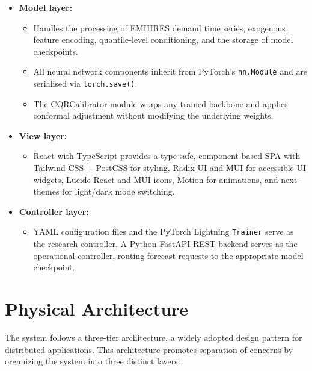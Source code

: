 \begin{itemize}
  \item \textbf{Model layer:}
  \begin{itemize}
    \item Handles the processing of EMHIRES demand time series, exogenous
          feature encoding, quantile-level conditioning, and the storage
          of model checkpoints.
    \item All neural network components inherit from PyTorch's
          \texttt{nn.Module} and are serialised via \texttt{torch.save()}.
    \item The CQRCalibrator module wraps any trained backbone and applies
          conformal adjustment without modifying the underlying weights.
  \end{itemize}
  \item \textbf{View layer:}
  \begin{itemize}
    \item React with TypeScript provides a
          type-safe, component-based SPA with Tailwind CSS + PostCSS
          for styling, Radix UI and MUI for accessible UI widgets,
          Lucide React and MUI icons, Motion for animations, and
          next-themes for light/dark mode switching.
    
  \end{itemize}
  \item \textbf{Controller layer:}
  \begin{itemize}
    \item YAML configuration files and the PyTorch Lightning
        \texttt{Trainer} serve as the research controller. A Python FastAPI
        REST backend serves as the operational controller, routing forecast
        requests to the appropriate model checkpoint.
  \end{itemize}
\end{itemize}

\section{Physical Architecture}
\label{sec:physical}

The system follows a three-tier architecture, a widely adopted design pattern
for distributed applications. This architecture promotes separation of concerns
by organizing the system into three distinct layers:


